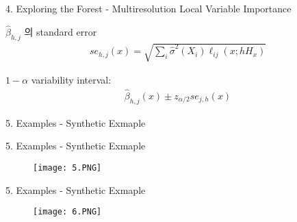 \documentclass[mathserif]{beamer}
\begin{document}
\begin{frame}{4. Exploring the Forest - Multiresolution Local Variable Importance}

$\hat{\beta}_{h,j}$ 의 standard error
\begin{align*}
    se_{h,j}(x) = \sqrt{\sum_i\hat{\sigma}^2(X_i)\ell_{ij}(x;hH_x)}
\end{align*}

$1-\alpha$ variability interval:
\begin{align*}
    \hat{\beta}_{h,j}(x) \pm z_{\alpha/2}se_{j,h}(x)
\end{align*}

\end{frame}

\begin{frame}{5. Examples - Synthetic Exmaple}

\begin{figure}%
%
%
\end{figure}
\end{frame}


\begin{frame}{5. Examples - Synthetic Exmaple}

\begin{figure}
        \centering
        \texttt{[image: 5.PNG]}
    \end{figure}
\end{frame}

\begin{frame}{5. Examples - Synthetic Exmaple}
\begin{figure}
        \centering
        \texttt{[image: 6.PNG]}
    \end{figure}
\end{frame}
\end{document}
